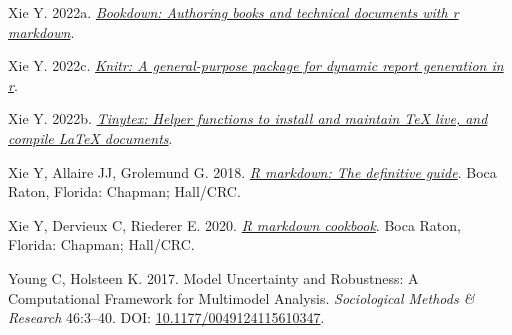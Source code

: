 \documentclass[10pt,a4paper]{article}
\newlength{\cslhangindent}
\newlength{\cslentryspacingunit} %
\newenvironment{CSLReferences}[2] %
 {%
  \setlength{\parindent}{0pt}
  \ifodd #1
  \let\oldpar\par
  \def\par{\hangindent=\cslhangindent\oldpar}
  \fi
  \setlength{\parskip}{#2\cslentryspacingunit}
 }%
 {}
\begin{document}
\begin{CSLReferences}{1}{0}
\leavevmode{}%
Xie Y. 2022a. \emph{\href{https://CRAN.R-project.org/package=bookdown}{Bookdown: Authoring books and technical documents with r markdown}}.

\leavevmode{}%
Xie Y. 2022c. \emph{\href{https://yihui.org/knitr/}{Knitr: A general-purpose package for dynamic report generation in r}}.

\leavevmode{}%
Xie Y. 2022b. \emph{\href{https://github.com/rstudio/tinytex}{Tinytex: Helper functions to install and maintain TeX live, and compile LaTeX documents}}.

\leavevmode{}%
Xie Y, Allaire JJ, Grolemund G. 2018. \emph{\href{https://bookdown.org/yihui/rmarkdown}{R markdown: The definitive guide}}. Boca Raton, Florida: Chapman; Hall/CRC.

\leavevmode{}%
Xie Y, Dervieux C, Riederer E. 2020. \emph{\href{https://bookdown.org/yihui/rmarkdown-cookbook}{R markdown cookbook}}. Boca Raton, Florida: Chapman; Hall/CRC.

\leavevmode{}%
Young C, Holsteen K. 2017. Model {Uncertainty} and {Robustness}: {A} {Computational} {Framework} for {Multimodel} {Analysis}. \emph{Sociological Methods \& Research} 46:3--40. DOI: \href{https://doi.org/10.1177/0049124115610347}{10.1177/0049124115610347}.

\end{CSLReferences}
\end{document}
